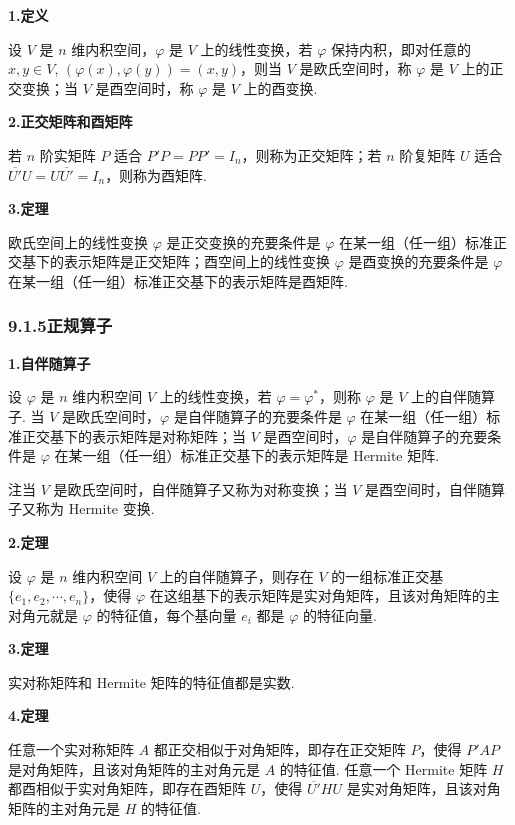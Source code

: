 \documentclass[UTF8,12pt,a4paper,fontset=fandol]{ctexart}
\begin{document}
\noindent\textbf{1.\quad 定义}

设 $V$ 是 $n$ 维内积空间，$\varphi$ 是 $V$ 上的线性变换，若 $\varphi$ 保持内积，即对任意的 $x,y\in V$, $(\varphi(x),\varphi(y))=(x,y)$，则当 $V$ 是欧氏空间时，称 $\varphi$ 是 $V$ 上的正交变换；当 $V$ 是酉空间时，称 $\varphi$ 是 $V$ 上的酉变换.

\noindent\textbf{2.\quad 正交矩阵和酉矩阵}

若 $n$ 阶实矩阵 $P$ 适合 $P'P=PP'=I_n$，则称为正交矩阵；若 $n$ 阶复矩阵 $U$ 适合 $\overline{U'}U=U\overline{U'}=I_n$，则称为酉矩阵.

\noindent\textbf{3.\quad 定理}

欧氏空间上的线性变换 $\varphi$ 是正交变换的充要条件是 $\varphi$ 在某一组（任一组）标准正交基下的表示矩阵是正交矩阵；酉空间上的线性变换 $\varphi$ 是酉变换的充要条件是 $\varphi$ 在某一组（任一组）标准正交基下的表示矩阵是酉矩阵.

\subsubsection*{9.1.5\quad 正规算子}

\noindent\textbf{1.\quad 自伴随算子}

设 $\varphi$ 是 $n$ 维内积空间 $V$ 上的线性变换，若 $\varphi=\varphi^*$，则称 $\varphi$ 是 $V$ 上的自伴随算子. 当 $V$ 是欧氏空间时，$\varphi$ 是自伴随算子的充要条件是 $\varphi$ 在某一组（任一组）标准正交基下的表示矩阵是对称矩阵；当 $V$ 是酉空间时，$\varphi$ 是自伴随算子的充要条件是 $\varphi$ 在某一组（任一组）标准正交基下的表示矩阵是 Hermite 矩阵.

注\quad 当 $V$ 是欧氏空间时，自伴随算子又称为对称变换；当 $V$ 是酉空间时，自伴随算子又称为 Hermite 变换.

\noindent\textbf{2.\quad 定理}

设 $\varphi$ 是 $n$ 维内积空间 $V$ 上的自伴随算子，则存在 $V$ 的一组标准正交基 $\{e_1,e_2,\cdots,e_n\}$，使得 $\varphi$ 在这组基下的表示矩阵是实对角矩阵，且该对角矩阵的主对角元就是 $\varphi$ 的特征值，每个基向量 $e_i$ 都是 $\varphi$ 的特征向量.

\noindent\textbf{3.\quad 定理}

实对称矩阵和 Hermite 矩阵的特征值都是实数.

\noindent\textbf{4.\quad 定理}

任意一个实对称矩阵 $A$ 都正交相似于对角矩阵，即存在正交矩阵 $P$，使得 $P'AP$ 是对角矩阵，且该对角矩阵的主对角元是 $A$ 的特征值. 任意一个 Hermite 矩阵 $H$ 都酉相似于实对角矩阵，即存在酉矩阵 $U$，使得 $\overline{U'}HU$ 是实对角矩阵，且该对角矩阵的主对角元是 $H$ 的特征值.
\end{document}
